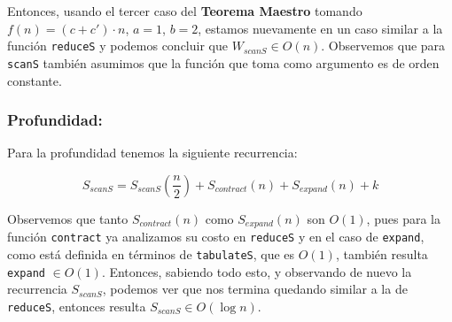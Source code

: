\documentclass[11pt]{article}
\begin{document}
Entonces, usando el tercer caso del \textbf{Teorema Maestro} tomando $f(n) = (c+c') \cdot n$, $a = 1$, $b = 2$, 
estamos nuevamente en un caso similar a la función \texttt{reduceS} y podemos
concluir que $W_{scanS} \in O(n)$. Observemos que para \texttt{scanS} también
asumimos que la función que toma como argumento es de orden constante. 

\subsubsection{Profundidad:}

Para la profundidad tenemos la siguiente recurrencia:

\begin{equation*}
    S_{scanS} = S_{scanS}(\frac{n}{2}) + S_{contract}(n) + S_{expand}(n) + k
\end{equation*}

Observemos que tanto $S_{contract}(n)$ como $S_{expand}(n)$ son $O(1)$, pues
para la función \texttt{contract} ya analizamos su costo en \texttt{reduceS} y en el 
caso de \texttt{expand}, como  está definida en términos de \texttt{tabulateS}, que
es $O(1)$, también resulta \texttt{expand} $\in O(1)$. Entonces, sabiendo todo esto, y observando de nuevo la recurrencia
$S_{scanS}$, podemos ver que nos termina quedando similar a la de \texttt{reduceS}, entonces 
resulta $S_{scanS} \in O(\log{n})$.
\end{document}
